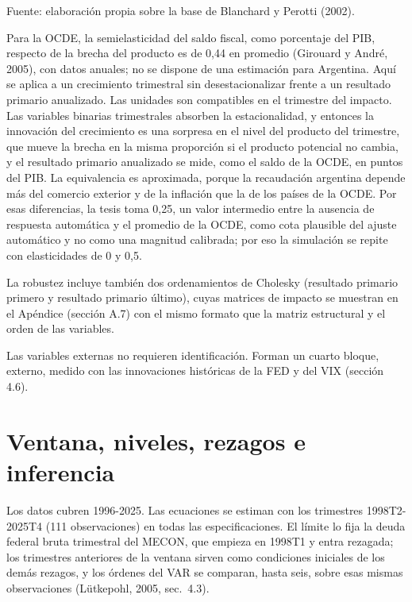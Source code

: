 Fuente: elaboración propia sobre la base de Blanchard y Perotti (2002).

Para la OCDE, la semielasticidad del saldo fiscal, como porcentaje del
PIB, respecto de la brecha del producto es de 0,44 en promedio (Girouard
y André, 2005), con datos anuales; no se dispone de una estimación para
Argentina. Aquí se aplica a un crecimiento trimestral sin
desestacionalizar frente a un resultado primario anualizado. Las
unidades son compatibles en el trimestre del impacto. Las variables
binarias trimestrales absorben la estacionalidad, y entonces la
innovación del crecimiento es una sorpresa en el nivel del producto del
trimestre, que mueve la brecha en la misma proporción si el producto
potencial no cambia, y el resultado primario anualizado se mide, como el
saldo de la OCDE, en puntos del PIB. La equivalencia es aproximada,
porque la recaudación argentina depende más del comercio exterior y de
la inflación que la de los países de la OCDE. Por esas diferencias, la
tesis toma 0,25, un valor intermedio entre la ausencia de respuesta
automática y el promedio de la OCDE, como cota plausible del ajuste
automático y no como una magnitud calibrada; por eso la simulación se
repite con elasticidades de 0 y 0,5.

La robustez incluye también dos ordenamientos de Cholesky (resultado
primario primero y resultado primario último), cuyas matrices de impacto
se muestran en el Apéndice (sección A.7) con el mismo formato que la
matriz estructural y el orden de las variables.

Las variables externas no requieren identificación. Forman un cuarto
bloque, externo, medido con las innovaciones históricas de la FED y del
VIX (sección 4.6).

\section{Ventana, niveles, rezagos e inferencia}

Los datos cubren 1996-2025. Las ecuaciones se estiman con los trimestres
1998T2-2025T4 (111 observaciones) en todas las especificaciones. El
límite lo fija la deuda federal bruta trimestral del MECON, que empieza
en 1998T1 y entra rezagada; los trimestres anteriores de la ventana
sirven como condiciones iniciales de los demás rezagos, y los órdenes
del VAR se comparan, hasta seis, sobre esas mismas observaciones
(Lütkepohl, 2005, sec.~4.3).

